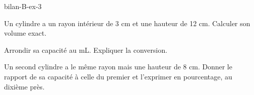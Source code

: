 \begin{blocEdition}{bilan-B-ex-3}
\begin{questions}
\item Un cylindre a un rayon intérieur de 3 cm et une hauteur de 12 cm. Calculer son volume exact.
\item Arrondir sa capacité au mL. Expliquer la conversion.
\item Un second cylindre a le même rayon mais une hauteur de 8 cm. Donner le rapport de sa capacité à celle du premier et l’exprimer en pourcentage, au dixième près.
\end{questions}\label{fig-bilan-B-ex-3}
\par{}\par\par{}\par{}\par{}\par{}\par{}\par{}
\end{blocEdition}
